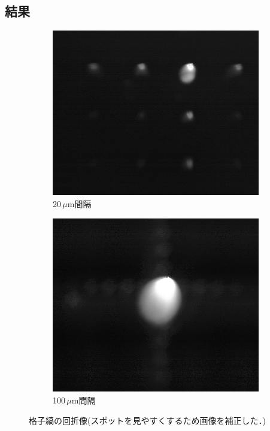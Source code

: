 \documentclass[titlepage]{jsarticle}
\begin{document}
\subsection{結果}
\begin{figure}[htbp]
    \centering
    \begin{subfigure}{0.4\columnwidth}
        \centering
        \includegraphics[width=\columnwidth]{20um_fourier_edit.png}
        \caption{20\,$\mu$m間隔}
        \label{fig:20fourier}
    \end{subfigure}
    \begin{subfigure}{0.4\columnwidth}
        \centering
        \includegraphics[width=\columnwidth]{100um_fourier_edit.png}
        \caption{100\,$\mu$m間隔}
        \label{fig:100fourier}
    \end{subfigure}    
    \caption{格子縞の回折像(スポットを見やすくするため画像を補正した．)}
    \label{fig:spots}
\end{figure}
\end{document}
